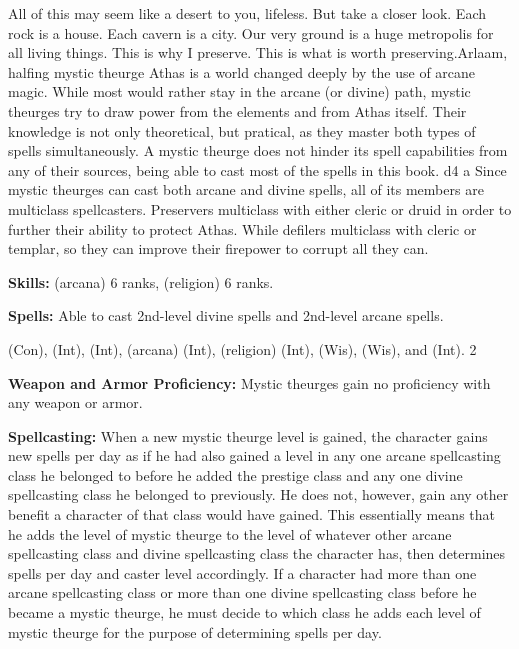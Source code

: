 {All of this may seem like a desert to you, lifeless. But take a closer look. Each rock is a house. Each cavern is a city. Our very ground is a huge metropolis for all living things. This is why I preserve. This is what is worth preserving.}{Arlaam, halfing mystic theurge}
{Athas is a world changed deeply by the use of arcane magic. While most would rather stay in the arcane (or divine) path, mystic theurges try to draw power from the elements and from Athas itself. Their knowledge is not only theoretical, but pratical, as they master both types of spells simultaneously. A mystic theurge does not hinder its spell capabilities from any of their sources, being able to cast most of the spells in this book.}
{d4}
{a}
{Since mystic theurges can cast both arcane and divine spells, all of its members are multiclass spellcasters. Preservers multiclass with either cleric or druid in order to further their ability to protect Athas. While defilers multiclass with cleric or templar, so they can improve their firepower to corrupt all they can.}
{
\textbf{Skills:}  (arcana) 6 ranks,  (religion) 6 ranks.

\textbf{Spells:} Able to cast 2nd-level divine spells and 2nd-level arcane spells.
}
{
 (Con),  (Int),  (Int),  (arcana) (Int),  (religion) (Int),  (Wis),  (Wis), and  (Int).
}
{2}
{}{}
{
\textbf{Weapon and Armor Proficiency:} Mystic theurges gain no proficiency with any weapon or armor.

\textbf{Spellcasting:} When a new mystic theurge level is gained, the character gains new spells per day as if he had also gained a level in any one arcane spellcasting class he belonged to before he added the prestige class and any one divine spellcasting class he belonged to previously. He does not, however, gain any other benefit a character of that class would have gained. This essentially means that he adds the level of mystic theurge to the level of whatever other arcane spellcasting class and divine spellcasting class the character has, then determines spells per day and caster level accordingly. If a character had more than one arcane spellcasting class or more than one divine spellcasting class before he became a mystic theurge, he must decide to which class he adds each level of mystic theurge for the purpose of determining spells per day.
}
